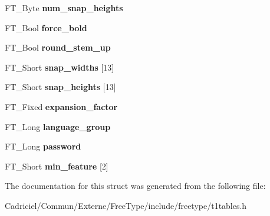 \begin{DoxyCompactItemize}
\item 
\hypertarget{struct_p_s___private_rec___a53f7cfd204400a00eb7203b67d6a1b1c}{F\-T\-\_\-\-Byte {\bfseries num\-\_\-snap\-\_\-heights}}\label{struct_p_s___private_rec___a53f7cfd204400a00eb7203b67d6a1b1c}

\item 
\hypertarget{struct_p_s___private_rec___a40e62a278e48f47a0f204bd9fa5c883f}{F\-T\-\_\-\-Bool {\bfseries force\-\_\-bold}}\label{struct_p_s___private_rec___a40e62a278e48f47a0f204bd9fa5c883f}

\item 
\hypertarget{struct_p_s___private_rec___a96b9729811d02146a87ffdc5c254bbe9}{F\-T\-\_\-\-Bool {\bfseries round\-\_\-stem\-\_\-up}}\label{struct_p_s___private_rec___a96b9729811d02146a87ffdc5c254bbe9}

\item 
\hypertarget{struct_p_s___private_rec___a39cf1a4b21280bf8082ccba0f4824a8a}{F\-T\-\_\-\-Short {\bfseries snap\-\_\-widths} \mbox{[}13\mbox{]}}\label{struct_p_s___private_rec___a39cf1a4b21280bf8082ccba0f4824a8a}

\item 
\hypertarget{struct_p_s___private_rec___a3583caf0cc05de2afac098574ed0bc4b}{F\-T\-\_\-\-Short {\bfseries snap\-\_\-heights} \mbox{[}13\mbox{]}}\label{struct_p_s___private_rec___a3583caf0cc05de2afac098574ed0bc4b}

\item 
\hypertarget{struct_p_s___private_rec___a45cf6e07c4c26f029e66998e6cad9fa0}{F\-T\-\_\-\-Fixed {\bfseries expansion\-\_\-factor}}\label{struct_p_s___private_rec___a45cf6e07c4c26f029e66998e6cad9fa0}

\item 
\hypertarget{struct_p_s___private_rec___afc2a7f950a174577ebfc062bb1598f5c}{F\-T\-\_\-\-Long {\bfseries language\-\_\-group}}\label{struct_p_s___private_rec___afc2a7f950a174577ebfc062bb1598f5c}

\item 
\hypertarget{struct_p_s___private_rec___a309a871cdeb6f658d8fbff23fa13b667}{F\-T\-\_\-\-Long {\bfseries password}}\label{struct_p_s___private_rec___a309a871cdeb6f658d8fbff23fa13b667}

\item 
\hypertarget{struct_p_s___private_rec___af8c829e03c424b1f12b2c9cd4041a868}{F\-T\-\_\-\-Short {\bfseries min\-\_\-feature} \mbox{[}2\mbox{]}}\label{struct_p_s___private_rec___af8c829e03c424b1f12b2c9cd4041a868}

\end{DoxyCompactItemize}


The documentation for this struct was generated from the following file\-:\begin{DoxyCompactItemize}
\item 
Cadriciel/\-Commun/\-Externe/\-Free\-Type/include/freetype/t1tables.\-h\end{DoxyCompactItemize}
